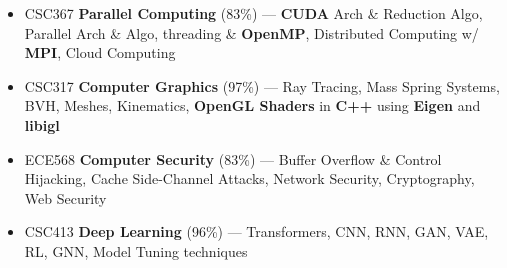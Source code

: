 \documentclass[10pt,a4paper,ragged2e,withhyper]{altacv}
\begin{document}
\begin{paracol}{2}
\begin{itemize}




    \end{itemize}

    \vspace{-3pt}

    \begin{itemize}
        \item  CSC367 \textbf{Parallel Computing} (83\%) ---
              \textbf{CUDA} Arch \& Reduction Algo, Parallel Arch \& Algo, threading \&
              \textbf{OpenMP}, Distributed Computing w/ \textbf{MPI}, Cloud Computing
        \item CSC317 \textbf{Computer Graphics} (97\%) --- Ray Tracing, Mass
              Spring Systems, BVH, Meshes, Kinematics, \textbf{OpenGL Shaders} in
              \textbf{C++} using \textbf{Eigen} and \textbf{libigl}
        \item ECE568 \textbf{Computer Security} (83\%) --- Buffer Overflow \& Control Hijacking, Cache Side-Channel Attacks, Network Security, Cryptography, Web Security 
        \item CSC413 \textbf{Deep Learning} (96\%) --- Transformers, CNN, RNN, GAN, VAE, RL, GNN, Model Tuning techniques


\end{itemize}
\end{paracol}
\end{document}
